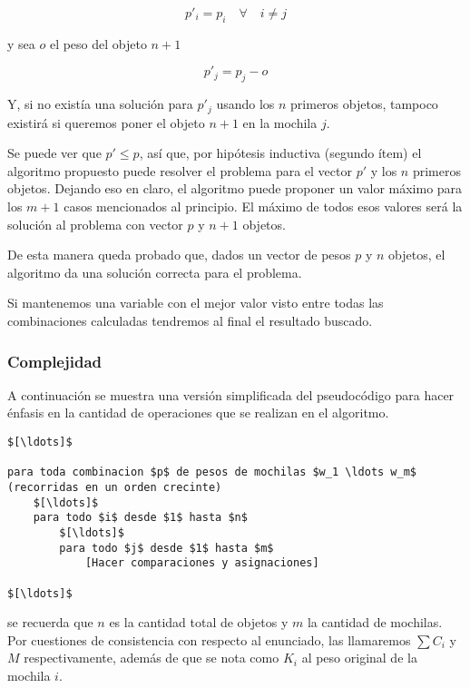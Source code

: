 $$p'_i = p_i \quad \forall \quad i \neq j$$

y sea $o$ el peso del objeto $n + 1$

$$p'_j = p_j - o$$

Y, si no existía una solución para $p'_j$ usando los $n$ primeros objetos, tampoco existirá si queremos poner el objeto $n+1$ en la mochila $j$.

Se puede ver que $p' \leq p$, así que, por hipótesis inductiva (segundo ítem) el algoritmo propuesto puede resolver el problema para el vector $p'$ y los $n$ primeros objetos. Dejando eso en claro, el algoritmo puede proponer un valor máximo para los $m + 1$ casos mencionados al principio. El máximo de todos esos valores será la solución al problema con vector $p$ y $n + 1$ objetos.

De esta manera queda probado que, dados un vector de pesos $p$ y $n$ objetos, el algoritmo da una solución correcta para el problema.

Si mantenemos una variable con el mejor valor visto entre todas las combinaciones calculadas tendremos al final el resultado buscado.

\QEDB

\subsubsection{Complejidad}

A continuación se muestra una versión simplificada del pseudocódigo para hacer énfasis en la cantidad de operaciones que se realizan en el algoritmo.

\begin{lstlisting}
$[\ldots]$

para toda combinacion $p$ de pesos de mochilas $w_1 \ldots w_m$ (recorridas en un orden crecinte)
	$[\ldots]$
	para todo $i$ desde $1$ hasta $n$
		$[\ldots]$
		para todo $j$ desde $1$ hasta $m$
			[Hacer comparaciones y asignaciones]

$[\ldots]$

\end{lstlisting}

se recuerda que $n$ es la cantidad total de objetos y $m$ la cantidad de mochilas. Por cuestiones de consistencia con respecto al enunciado, las llamaremos $\sum C_i$ y $M$ respectivamente, además de que se nota como $K_i$ al peso original de la mochila $i$.

